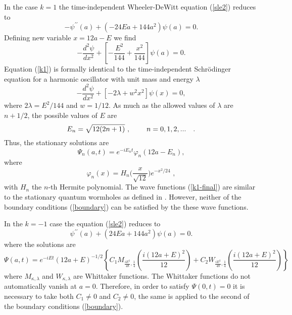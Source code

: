In the case $k=1$ the time-independent Wheeler-DeWitt equation (\ref{sle2}) reduces to
\begin{equation}
-{\psi}^{\prime \prime}(a) + \left(- 24Ea + 144a^{2}\right){\psi}(a)=0.
\end{equation}
Defining new variable $x=12a - E$ we find
\begin{equation}\label{k1}
-\frac{d^{2}\psi}{dx^{2}}+\left[- \frac{E^{2}}{144}+\frac{x^{2}}{144} \right]\psi(a) =0.
\end{equation}
Equation (\ref{k1}) is formally identical to the time-independent Schr\"odinger equation for a
harmonic oscillator with unit mass and energy $\lambda$
\begin{equation}
-\frac{d^{2}\psi}{dx^{2}}+\left[- 2\lambda+w^{2}x^{2}\right]\psi(x) =0,
\end{equation}
where $2\lambda = E^{2}/144$ and $w=1/12$. As much as the allowed
values of $\lambda$ are $n+1/2$, the possible values of $E$ are
\begin{equation}
E_{n}=\sqrt{12(2n+1)}\,\, , \mbox{\hspace{0.8cm}} n=0,1,2,...\quad .
\end{equation}
Thus, the  stationary solutions are
\begin{equation}
{\Psi}_{n}(a,t)=e^{-iE_{n}t}{\varphi}_{n}\left(12a - E_{n}\right), \label{k1-final}
\end{equation}
where
\begin{equation}
{\varphi}_{n}(x)=H_n\bigg(\frac{x}{\sqrt{12}}\bigg)e^{-x^2/24}\,\, ,
\label{dust7}
\end{equation}
with $H_n$  the $n$-th Hermite polynomial. The wave functions (\ref{k1-final}) are similar to the
stationary quantum wormholes as defined in \cite{Hawking}. However, neither of the boundary
conditions (\ref{boundary}) can be satisfied by the these wave functions.

In the $k=-1$ case the equation (\ref{sle2}) reduces to
\begin{equation}
{\psi}^{\prime \prime}(a) + \left(24Ea + 144a^{2}\right){\psi}(a)=0.
\end{equation}
where the solutions are
\begin{equation}
\label{whittaker} \Psi (a,t)=e^{-iEt}(12a+E)^{-1/2}\left\{ C_{1}M_{\frac{iE^2}{48},\frac{1}{4}}(\frac{i(12a+E)^2}{12}) +
C_{2}W_{\frac{iE^2}{48},\frac{1}{4}}(\frac{i(12a+E)^2}{12})\right\}
\end{equation}
where $M_{\kappa , \lambda}$ and $W_{\kappa , \lambda}$ are Whittaker functions. The Whittaker
functions do not automatically vanish at $a=0$. Therefore, in order to satisfy $\Psi(0,t)=0$ it is
necessary to take both $C_{1}\neq 0$ and $C_{2}\neq 0$, the same is applied to the second of the
boundary conditions (\ref{boundary}).

